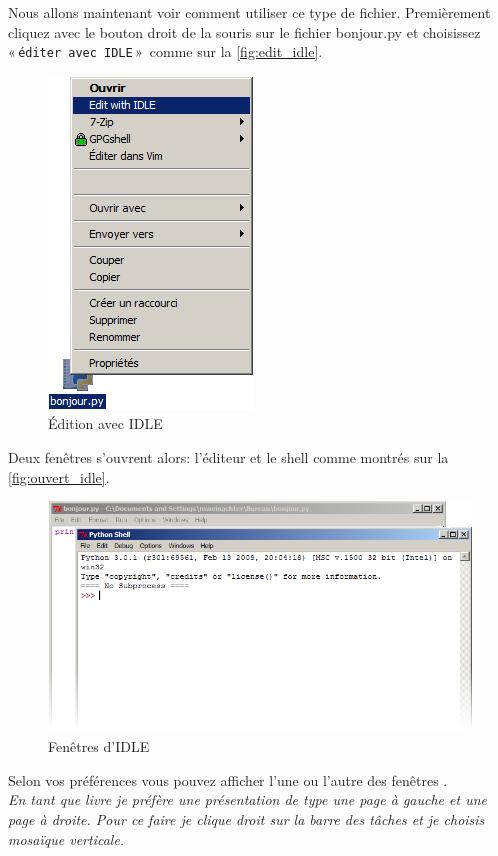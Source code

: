 Nous allons maintenant voir comment utiliser ce type de fichier.
Premièrement cliquez avec le bouton droit de la souris sur le fichier bonjour.py et choisissez « \texttt{éditer avec IDLE} »  comme sur la \autoref{fig:edit_idle}.
\begin{figure}[h!]
\centering
\includegraphics[scale=0.5]{images/edit_idle.png} 
\caption{Édition avec IDLE}
\label{fig:edit_idle}
\end{figure}

Deux fenêtres s'ouvrent alors: l'éditeur et le shell comme montrés sur 
la \autoref{fig:ouvert_idle}.
\begin{figure}[h!]
\centering
\includegraphics[scale=0.5]{images/ouvert_idle.png} 
\caption{Fenêtres d'IDLE}
\label{fig:ouvert_idle}
\end{figure}

Selon vos préférences vous pouvez afficher l'une ou l'autre des fenêtres . \\

\emph{En tant que livre je préfère une présentation de type une page à gauche et
 une page à droite. Pour ce faire je clique droit sur la barre des tâches et je choisis mosaïque verticale.}\\

